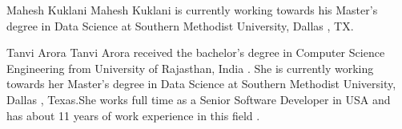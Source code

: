 \documentclass[journal]{hybrid-cloud}
\begin{document}

\begin{IEEEbiographynophoto}{Mahesh Kuklani}
Mahesh Kuklani is currently working towards his Master's degree in Data Science at Southern Methodist University, Dallas , TX.
\end{IEEEbiographynophoto}


\begin{IEEEbiographynophoto}{Tanvi Arora}
Tanvi Arora received the bachelor's degree in Computer Science Engineering from University of Rajasthan, India . She is currently working towards her Master's degree in Data Science at Southern Methodist University, Dallas , Texas.She works full time as a Senior Software Developer in USA and has about 11 years of work experience in this field .
\end{IEEEbiographynophoto}






\end{document}
